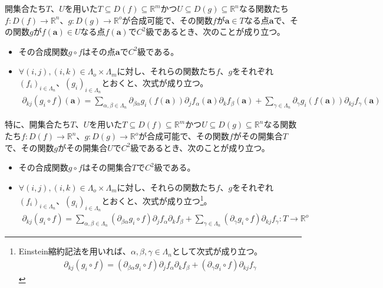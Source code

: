 \documentclass[dvipdfmx]{jsarticle}
\begin{document}
\begin{thm}\label{4.2.6.11}
開集合たち$T$、$U$を用いた$T \subseteq D(f) \subseteq \mathbb{R}^{m}$かつ$U \subseteq D(g) \subseteq \mathbb{R}^{n}$なる関数たち$f:D(f) \rightarrow \mathbb{R}^{n}$、$g:D(g) \rightarrow \mathbb{R}^{o}$が合成可能で、その関数$f$が$\mathbf{a} \in T$なる点$\mathbf{a}$で、その関数$g$が$f\left( \mathbf{a} \right) \in U$なる点$f\left( \mathbf{a} \right)$で$C^{2}$級であるとき、次のことが成り立つ。
\begin{itemize}
\item
  その合成関数$g \circ f$はその点$\mathbf{a}$で$C^{2}$級である。
\item
  $\forall(i,j),(i,k) \in \varLambda_{o} \times \varLambda_{m}$に対し、それらの関数たち$f$、$g$をそれぞれ$\left( f_{i} \right)_{i \in \varLambda_{n}}$、$\left( g_{i} \right)_{i \in \varLambda_{n}}$とおくと、次式が成り立つ。
\begin{align*}
\partial_{kj}\left( g_{i} \circ f \right)\left( \mathbf{a} \right) = \sum_{\alpha,\beta \in \varLambda_{n}} {\partial_{\beta\alpha}g_{i}\left( f\left( \mathbf{a} \right) \right)\partial_{j}f_{\alpha}\left( \mathbf{a} \right)\partial_{k}f_{\beta}\left( \mathbf{a} \right)} + \sum_{\gamma \in \varLambda_{n}} {\partial_{\gamma}g_{i}\left( f\left( \mathbf{a} \right) \right)\partial_{kj}f_{\gamma}\left( \mathbf{a} \right)}
\end{align*}
\end{itemize}\par
特に、開集合たち$T$、$U$を用いた$T \subseteq D(f) \subseteq \mathbb{R}^{m}$かつ$U \subseteq D(g) \subseteq \mathbb{R}^{n}$なる関数たち$f:D(f) \rightarrow \mathbb{R}^{n}$、$g:D(g) \rightarrow \mathbb{R}^{o}$が合成可能で、その関数$f$がその開集合$T$で、その関数$g$がその開集合$U$で$C^{2}$級であるとき、次のことが成り立つ。
\begin{itemize}
\item
  その合成関数$g \circ f$はその開集合$T$で$C^{2}$級である。
\item
  $\forall(i,j),(i,k) \in \varLambda_{o} \times \varLambda_{m}$に対し、それらの関数たち$f$、$g$をそれぞれ$\left( f_{i} \right)_{i \in \varLambda_{n}}$、$\left( g_{i} \right)_{i \in \varLambda_{n}}$とおくと、次式が成り立つ\footnote{Einstein縮約記法を用いれば、$\alpha,\beta,\gamma \in \varLambda_{n}$として次式が成り立つ。
\begin{align*}
\partial_{kj}\left( g_{i} \circ f \right) = \left( \partial_{\beta\alpha}g_{i} \circ f \right)\partial_{j}f_{\alpha}\partial_{k}f_{\beta} + \left( \partial_{\gamma}g_{i} \circ f \right)\partial_{kj}f_{\gamma}
\end{align*}}。
\begin{align*}
\partial_{kj}\left( g_{i} \circ f \right) = \sum_{\alpha,\beta \in \varLambda_{n}} {\left( \partial_{\beta\alpha}g_{i} \circ f \right)\partial_{j}f_{\alpha}\partial_{k}f_{\beta}} + \sum_{\gamma \in \varLambda_{n}} {\left( \partial_{\gamma}g_{i} \circ f \right)\partial_{kj}f_{\gamma}}:T \rightarrow \mathbb{R}^{o}
\end{align*}
\end{itemize}
\end{thm}
\end{document}

